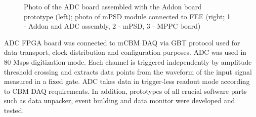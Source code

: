 \documentclass{CBM-PR-2020}
\begin{document}
\begin{figure}[htbp]
\centering %
\qquad
{}
\caption{\label{fig:4} Photo of the ADC board assembled with the Addon board prototype (left); photo of mPSD module connected to FEE (right; 1 - Addon and ADC assembly, 2 - mPSD, 3 - MPPC board)}
\end{figure}

ADC FPGA board was connected to mCBM DAQ via GBT protocol used for data transport, clock distribution and configuration purposes. ADC was used in 80 Msps digitization mode. Each channel is triggered independently by amplitude threshold crossing and extracts data points from the waveform of the input signal measured in a fixed gate. ADC takes data in trigger-less readout mode according to CBM DAQ requirements. In addition, prototypes of all crucial software parts such as data unpacker, event building and data monitor were developed and tested.
\end{document}
